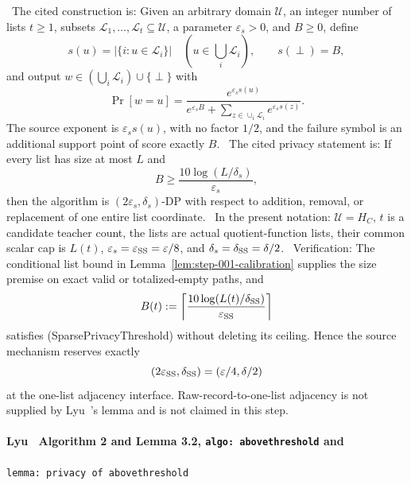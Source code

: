 \noindent\textbullet\ The cited construction is: Given an arbitrary domain \(\mathcal U\), an
  integer number of lists \(t\ge1\), subsets
  \(\mathcal L_1,\ldots,\mathcal L_t\subseteq\mathcal U\), a parameter
  \(\varepsilon_s>0\), and \(B\ge0\), define
  \[
  s(u)=|\{i:u\in\mathcal L_i\}|\quad
  (u\in\textstyle\bigcup_i\mathcal L_i),
  \qquad s(\perp)=B,
  \]
  and output \(w\in(\bigcup_i\mathcal L_i)\cup\{\perp\}\) with
  \[
  \Pr[w=u]
  =\frac{e^{\varepsilon_s s(u)}}
  {e^{\varepsilon_s B}+
    \sum_{z\in\cup_i\mathcal L_i}e^{\varepsilon_s s(z)}}.
  \tag{SparseLaw}
  \]
  The source exponent is \(\varepsilon_s s(u)\), with no factor \(1/2\),
  and the failure symbol is an additional support point of score exactly
  \(B\).
\noindent\textbullet\ The cited privacy statement is: If every list has size at most \(L\) and
  \[
  B\ge \frac{10\log(L/\delta_s)}{\varepsilon_s},
  \tag{SparsePrivacyThreshold}
  \]
  then the algorithm is \((2\varepsilon_s,\delta_s)\)-DP with respect to
  addition, removal, or replacement of one entire list coordinate.
\noindent\textbullet\ In the present notation: \(\mathcal U=H_C\), \(t\) is a candidate teacher count,
  the lists are actual quotient-function lists, their common scalar cap is
  \(L(t)\), \(\varepsilon_s=\varepsilon_{\rm SS}=\varepsilon/8\), and
  \(\delta_s=\delta_{\rm SS}=\delta/2\).
\noindent\textbullet\ Verification: The conditional list bound in
  Lemma~\ref{lem:step-001-calibration} supplies the size premise on exact
  valid or totalized-empty paths, and
  \[
  B(t):=\left\lceil
  \frac{10\log(L(t)/\delta_{\rm SS})}{\varepsilon_{\rm SS}}
  \right\rceil
  \]
  satisfies (SparsePrivacyThreshold) without deleting its ceiling. Hence the
  source mechanism reserves exactly
  \[
  (2\varepsilon_{\rm SS},\delta_{\rm SS})
  =(\varepsilon/4,\delta/2)
  \]
  at the one-list adjacency interface. Raw-record-to-one-list adjacency is
  not supplied by Lyu~\citep{lyu2025}'s lemma and is not claimed in this step.

\paragraph{Lyu~\citep{lyu2025} Algorithm 2 and Lemma 3.2, \texttt{algo: abovethreshold} and}
\texttt{lemma: privacy of abovethreshold}


